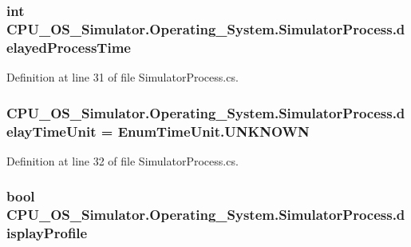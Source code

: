 \subsubsection[{delayed\+Process\+Time}]{\setlength{\rightskip}{0pt plus 5cm}int C\+P\+U\+\_\+\+O\+S\+\_\+\+Simulator.\+Operating\+\_\+\+System.\+Simulator\+Process.\+delayed\+Process\+Time\hspace{0.3cm}{\ttfamily [private]}}\label{class_c_p_u___o_s___simulator_1_1_operating___system_1_1_simulator_process_a17a480e988d10e48af5478b5ebe0794d}


Definition at line 31 of file Simulator\+Process.\+cs.

\hypertarget{class_c_p_u___o_s___simulator_1_1_operating___system_1_1_simulator_process_aa2ff3f17dc017fb3ad5285e85661ab47}{}
\subsubsection[{delay\+Time\+Unit}]{ C\+P\+U\+\_\+\+O\+S\+\_\+\+Simulator.\+Operating\+\_\+\+System.\+Simulator\+Process.\+delay\+Time\+Unit = {\bf Enum\+Time\+Unit.\+U\+N\+K\+N\+O\+W\+N}\hspace{0.3cm}{\ttfamily [private]}}\label{class_c_p_u___o_s___simulator_1_1_operating___system_1_1_simulator_process_aa2ff3f17dc017fb3ad5285e85661ab47}


Definition at line 32 of file Simulator\+Process.\+cs.

\hypertarget{class_c_p_u___o_s___simulator_1_1_operating___system_1_1_simulator_process_a7074283e2d023d83df86651f98da7003}{}
\subsubsection[{display\+Profile}]{\setlength{\rightskip}{0pt plus 5cm}bool C\+P\+U\+\_\+\+O\+S\+\_\+\+Simulator.\+Operating\+\_\+\+System.\+Simulator\+Process.\+display\+Profile\hspace{0.3cm}{\ttfamily [private]}}\label{class_c_p_u___o_s___simulator_1_1_operating___system_1_1_simulator_process_a7074283e2d023d83df86651f98da7003}


